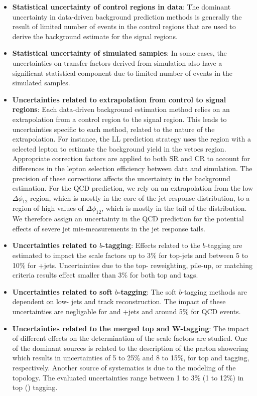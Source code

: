 \begin{itemize}
	\item \textbf{Statistical uncertainty of control regions in data}: The dominant uncertainty in data-driven background prediction methods is generally the result of limited number of events in the control regions that are used to derive the background estimate for the signal regions.
	\item \textbf{Statistical uncertainty of simulated samples}: In some cases, the uncertainties on transfer factors derived from simulation also have a significant statistical component due to limited number of events in the simulated samples.
	\item \textbf{Uncertainties related to extrapolation from control to signal regions}: Each data-driven background estimation method relies on an extrapolation from a control region to the signal region. This leads to uncertainties specific to each method, related to the nature of the extrapolation. For instance, the LL prediction strategy uses the region with a selected lepton to estimate the background yield in the vetoes region. Appropriate correction factors are applied to both SR and CR to account for differences in the lepton selection efficiency between data and simulation. The precision of these corrections affects the uncertainty in the background estimation. For the QCD prediction, we rely on an extrapolation from the low $\Delta\phi_{12}$ region, which is mostly in the core of the jet response distribution, to a region of high values of $\Delta\phi_{12}$, which is mostly in the tail of the distribution. We therefore assign an uncertainty in the QCD prediction for the potential effects of severe jet mis-measurements in the jet response tails. 
	\item \textbf{Uncertainties related to $b$-tagging}: Effects related to the $b$-tagging are estimated to impact the scale factors up to 3\% for top-jets and between 5 to 10\% for \W+jets. Uncertainties due to the top-\pt{} reweighting, pile-up, or matching criteria results effect smaller than 3\% for both top and \W{} tags. 
	\item \textbf{Uncertainties related to soft $b$-tagging}: The soft $b$-tagging methods are dependent on low-\pt{} jets and track reconstruction. The impact of these uncertainties are negligable for \ttbar{} and \W+jets and around 5\% for QCD events.
	\item \textbf{Uncertainties related to the merged top and W-tagging}: The impact of different effects on the determination of the scale factors are studied. One of the dominant sources is related to the description of the parton showering which results in uncertainties of 5 to 25\% and 8 to 15\%, for top and \W{} tagging, respectively. Another source of systematics is due to the modeling of the \ttbar{} topology. The evaluated uncertainties range between 1 to 3\% (1 to 12\%) in top (\W) tagging. 

\end{itemize}
